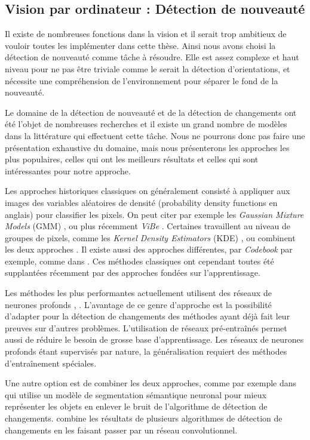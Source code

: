 \subsection{Vision par ordinateur : Détection de nouveauté}

	Il existe de nombreuses fonctions dans la vision et il serait trop ambitieux de vouloir toutes les implémenter dans cette thèse. Ainsi nous avons choisi la détection de nouveauté comme tâche à résoudre. Elle est assez complexe et haut niveau pour ne pas être triviale comme le serait la détection d'orientations, et nécessite une compréhension de l'environnement pour séparer le fond de la nouveauté. 

	Le domaine de la détection de nouveauté et de la détection de changements ont été l'objet de nombreuses recherches et il existe un grand nombre de modèles dans la littérature qui effectuent cette tâche. Nous ne pourrons donc pas faire une présentation exhaustive du domaine, mais nous présenterons les approches les plus populaires, celles qui ont les meilleurs résultats et celles qui sont intéressantes pour notre approche.

	Les approches historiques classiques on généralement consisté à appliquer aux images des variables aléatoires de densité (probability density functions en anglais) pour classifier les pixels. On peut citer par exemple les \textit{Gaussian Mixture Models} (GMM) \cite{zivkovic2004improved}, ou plus récemment \textit{ViBe} \cite{barnich2009vibe}. Certaines travaillent au niveau de groupes de pixels, comme les \textit{Kernel Density Estimators} (KDE) \cite{elgammal2000non}, ou combinent les deux approches \cite{toyama1999wallflower}. Il existe aussi des approches différentes, par \textit{Codebook} par exemple, comme dans \cite{kim2004background}. Ces méthodes classiques ont cependant toutes été supplantées récemment par des approches fondées sur l'apprentissage.

	Les méthodes les plus performantes actuellement utilisent des réseaux de neurones profonds \cite{tezcan2021bsuv}, \cite{bouwmans2019deep}. L'avantage de ce genre d'approche est la possibilité d'adapter pour la détection de changements des méthodes ayant déjà fait leur preuves sur d'autres problèmes. L'utilisation de réseaux pré-entraînés permet aussi de réduire le besoin de grosse base d'apprentissage. Les réseaux de neurones profonds étant supervisés par nature, la généralisation requiert des méthodes d'entraînement spéciales.

	Une autre option est de combiner les deux approches, comme par exemple dans \cite{braham2017semantic} qui utilise un modèle de segmentation sémantique neuronal pour mieux représenter les objets en enlever le bruit de l'algorithme de détection de changements. \cite{zeng2019combining} combine les résultats de plusieurs algorithmes de détection de changements en les faisant passer par un réseau convolutionnel.

